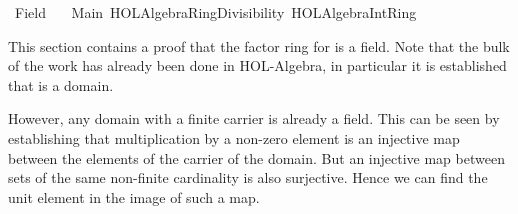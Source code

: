 %
\begin{isabellebody}%
%
%
\isadelimdocument
%
\endisadelimdocument
%
\isatagdocument
%
\isamarkuptrue%
%
\endisatagdocument
{\isafolddocument}%
%
\isadelimdocument
%
\endisadelimdocument
%
\isadelimtheory
%
\endisadelimtheory
%
\isatagtheory
{}\isamarkupfalse%
\ Field\isanewline
\ \ \ Main\ {\isachardoublequoteopen}HOL{\isacharminus}{\kern0pt}Algebra{\isachardot}{\kern0pt}Ring{\isacharunderscore}{\kern0pt}Divisibility{\isachardoublequoteclose}\ {\isachardoublequoteopen}HOL{\isacharminus}{\kern0pt}Algebra{\isachardot}{\kern0pt}IntRing{\isachardoublequoteclose}\isanewline
{}%
\endisatagtheory
{\isafoldtheory}%
%
\isadelimtheory
%
\endisadelimtheory
%
\begin{isamarkuptext}%
This section contains a proof that the factor ring  for
 is a field. Note that the bulk of the work has already been done in
HOL-Algebra, in particular it is established that  is a domain.

However, any domain with a finite carrier is already a field. This can be seen by establishing that
multiplication by a non-zero element is an injective map between the elements of the carrier of the
domain. But an injective map between sets of the same non-finite cardinality is also surjective.
Hence we can find the unit element in the image of such a map.


\end{isamarkuptext}
\end{isabellebody}
